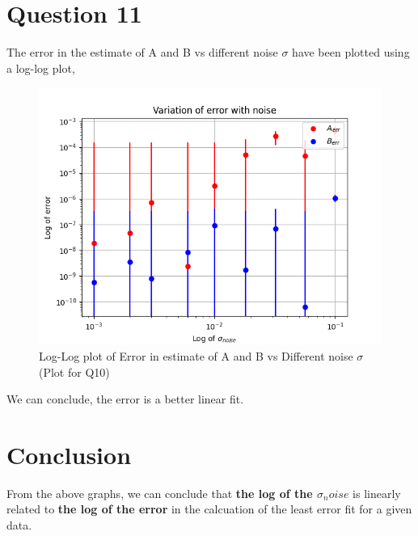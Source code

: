 \documentclass[11pt, a4paper]{article}
\begin{document}
          \section{Question 11}
            The error in the estimate of A and B vs different noise $\sigma$ have been plotted using a log-log plot, 
            \begin{figure}[H]
                \centering
                \includegraphics[scale=0.9]{Figure4.png}
                \caption{Log-Log plot of Error in estimate of A and B vs Different noise $\sigma$(Plot for Q10)}
            \end{figure}            
             We can conclude, the error is a better linear fit.
    \section{Conclusion}
        From the above graphs, we can conclude that \textbf{the log of the $\sigma_noise$} is linearly related to \textbf{the log of the error} in the calcuation of the least error fit for a given data.
\end{document}
